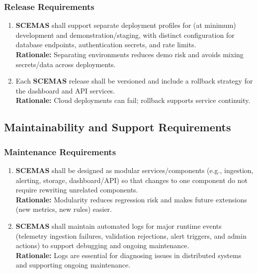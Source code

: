 \documentclass[]{article}
\begin{document}
\subsubsection{Release Requirements}
\label{ssub:release_requirements}
\begin{enumerate}[{OE-R}1. ]
	\item \textbf{SCEMAS} shall support separate deployment profiles for (at minimum) development and demonstration/staging, with distinct configuration for database endpoints, authentication secrets, and rate limits.\\
    \textbf{Rationale:} Separating environments reduces demo risk and avoids mixing secrets/data across deployments.
    
	\item Each \textbf{SCEMAS} release shall be versioned and include a rollback strategy for the dashboard and API services.\\
    \textbf{Rationale:} Cloud deployments can fail; rollback supports service continuity.
\end{enumerate}



\subsection{Maintainability and Support Requirements}
\label{sub:maintainability_and_support_requirements}

\subsubsection{Maintenance Requirements}
\label{ssub:maintenance_requirements}
\begin{enumerate}[{MS-M}1. ]
	\item \textbf{SCEMAS} shall be designed as modular services/components (e.g., ingestion, alerting, storage, dashboard/API) so that changes to one component do not require rewriting unrelated components.\\
    \textbf{Rationale:} Modularity reduces regression risk and makes future extensions (new metrics, new rules) easier.
    
	\item \textbf{SCEMAS} shall maintain automated logs for major runtime events (telemetry ingestion failures, validation rejections, alert triggers, and admin actions) to support debugging and ongoing maintenance.\\
    \textbf{Rationale:} Logs are essential for diagnosing issues in distributed systems and supporting ongoing maintenance.
\end{enumerate}
\end{document}
